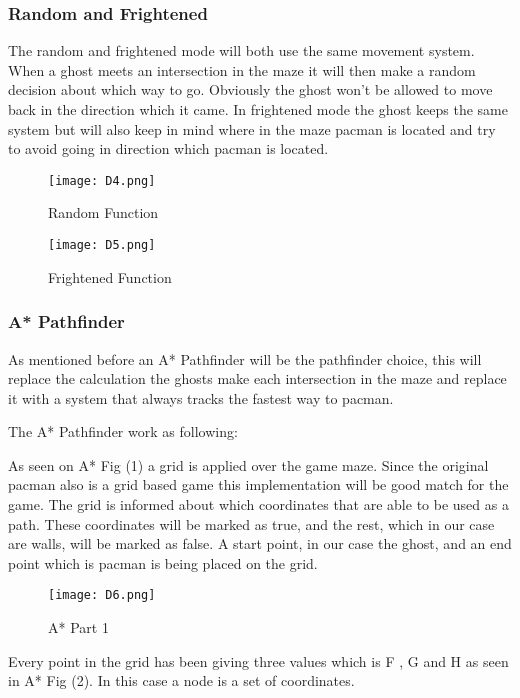 \subsubsection{Random and Frightened}
The random and frightened mode will both use the same movement system. When a ghost meets an intersection in the maze it will then make a random decision about which way to go. Obviously the ghost won’t be allowed to move back in the direction which it came. In frightened mode the ghost keeps the same system but will also keep in mind where in the maze pacman is located and try to avoid going in direction which pacman is located. 


\begin{figure}[!htbp]
\centering
\texttt{[image: D4.png]}
\caption{ Random Function }
\label{fig:Random}
\end{figure}

\begin{figure}[!htbp]
\centering
\texttt{[image: D5.png]}
\caption{ Frightened Function }
\label{fig:Frightened}
\end{figure}

\subsubsection{A* Pathfinder}
As mentioned before an A* Pathfinder will be the pathfinder choice, this will replace the calculation the ghosts make each intersection in the maze and replace it with a system that always tracks the fastest way to pacman.

The A* Pathfinder work as following:

As seen on A* Fig (1) a grid is applied over the game maze. Since the original pacman also is a grid based game this implementation will be good match for the game. The grid is informed about which coordinates that are able to be used as a path. These coordinates will be marked as true, and the rest, which in our case are walls, will be marked as false. A start point, in our case the ghost, and an end point which is pacman is being placed on the grid. 


\begin{figure}[!htbp]
\centering
\texttt{[image: D6.png]}
\caption{ A* Part 1 }
\label{fig:A1}
\end{figure}

Every point in the grid has been giving three values which is F , G and H as seen in A* Fig (2). In this case a node is a set of coordinates.

